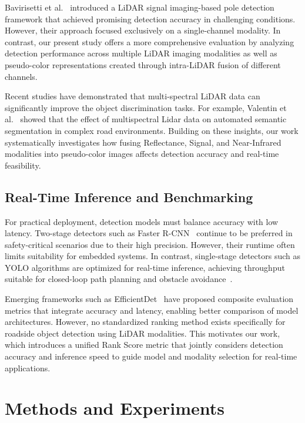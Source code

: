 \documentclass[runningheads]{llncs}
\begin{document}
Bavirisetti et al.~\cite{bavirisetti2024pole} introduced a LiDAR signal imaging-based pole detection framework that achieved promising detection accuracy in challenging conditions. However, their approach focused exclusively on a single-channel modality. In contrast, our present study offers a more comprehensive evaluation by analyzing detection performance across multiple LiDAR imaging modalities as well as pseudo-color representations created through intra-LiDAR fusion of different channels.

Recent studies have demonstrated that multi-spectral LiDAR data can significantly improve the object discrimination tasks. For example, Valentin et al.~\cite{vierhub2022study} showed that the effect of multispectral Lidar data on automated semantic segmentation in complex road environments. Building on these insights, our work systematically investigates how fusing Reflectance, Signal, and Near-Infrared modalities into pseudo-color images affects detection accuracy and real-time feasibility.

\subsection{Real-Time Inference and Benchmarking}

For practical deployment, detection models must balance accuracy with low latency. Two-stage detectors such as Faster R-CNN~\cite{ren2015faster} continue to be preferred in safety-critical scenarios due to their high precision. However, their runtime often limits suitability for embedded systems. In contrast, single-stage detectors such as YOLO algorithms are optimized for real-time inference, achieving throughput suitable for closed-loop path planning and obstacle avoidance~\cite{wang2023yolov7}.

Emerging frameworks such as EfficientDet~\cite{tan2020efficientdet} have proposed composite evaluation metrics that integrate accuracy and latency, enabling better comparison of model architectures. However, no standardized ranking method exists specifically for roadside object detection using LiDAR modalities. This motivates our work, which introduces a unified Rank Score metric that jointly considers detection accuracy and inference speed to guide model and modality selection for real-time applications.


\section{Methods and Experiments}
\end{document}
